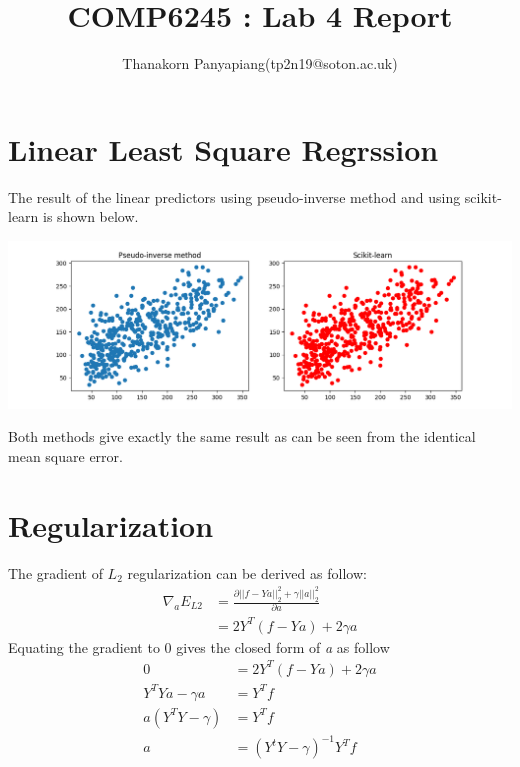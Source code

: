 \documentclass{article}
\title{COMP6245 : Lab 4 Report}
\author{Thanakorn Panyapiang(tp2n19@soton.ac.uk)}
\date{}
\begin{document}
\maketitle

\section{Linear Least Square Regrssion}
The result of the linear predictors using pseudo-inverse method and using scikit-learn is shown below.
\begin{center}
\includegraphics[scale=0.3]{diabetes_accuracy}
\end{center}
Both methods give exactly the same result as can be seen from the identical mean square error.

\section{Regularization}

The gradient of $L_{2}$ regularization can be derived as follow:
\begin{equation}
\begin{split}
	\nabla _aE_{L2} &= \frac{\partial ||f - Ya||^2_2 + \gamma ||a||^2_2}{\partial a}\\
	 &= 2Y^T(f - Ya) + 2\gamma a
\end{split}
\end{equation}
Equating the gradient to 0 gives the closed form of \textit{a} as follow
\begin{equation}
\begin{split}
	0 &= 2Y^T(f - Ya) + 2\gamma a\\
	Y^TYa - \gamma a &= Y^Tf\\
	a(Y^TY - \gamma) &= Y^Tf\\
	a &= (Y^tY - \gamma)^{-1} Y^Tf 
\end{split}
\end{equation}
\end{document}
